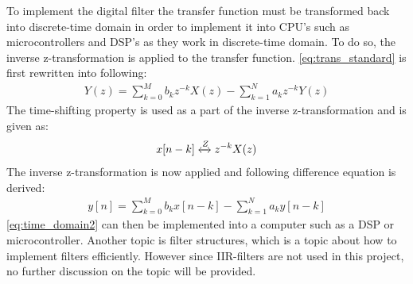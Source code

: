 To implement the digital filter the transfer function must be transformed back into discrete-time domain in order to implement it into CPU's such as microcontrollers and DSP's as they work in discrete-time domain. To do so, the inverse z-transformation is applied to the transfer function. \autoref{eq:trans_standard} is first rewritten into following:
\begin{align}
Y(z) = \sum\limits_{k=0}^{M}b_kz^{-k}X(z) -\sum\limits_{k=1}^{N}a_kz^{-k}Y(z)
\label{eq:z_domain_trans}
\end{align}
The time-shifting property is used as a part of the inverse z-transformation and is given as:
\begin{align}
x[n-k] \xleftrightarrow{Z} z^{-k} X(z)
\label{eq:time_shifting}
\end{align}
The inverse z-transformation is now applied and following difference equation is derived:
\begin{align}
y[n] =  \sum\limits_{k=0}^{M}b_kx[n-k] -\sum\limits_{k=1}^{N}a_ky[n-k]
\label{eq:time_domain2}
\end{align}
\autoref{eq:time_domain2} can then be implemented into a computer such as a DSP or microcontroller. Another topic is filter structures, which is a topic about how to implement filters efficiently. However since IIR-filters are not used in this project, no further discussion on the topic will be provided.










